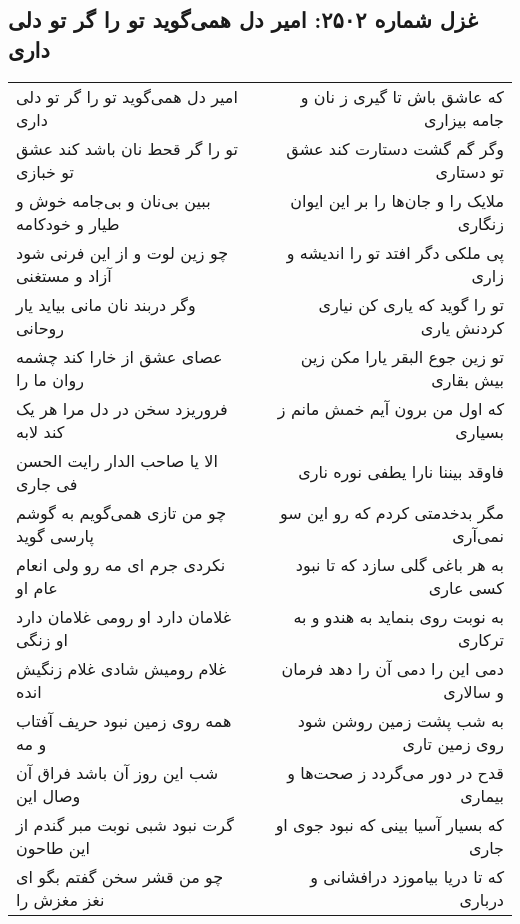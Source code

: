 \begin{center}
\section*{غزل شماره ۲۵۰۲: امیر دل همی‌گوید تو را گر تو دلی داری}
\label{sec:2502}
\begin{longtable}{l p{0.5cm} r}
امیر دل همی‌گوید تو را گر تو دلی داری
&&
که عاشق باش تا گیری ز نان و جامه بیزاری
\\
تو را گر قحط نان باشد کند عشق تو خبازی
&&
وگر گم گشت دستارت کند عشق تو دستاری
\\
ببین بی‌نان و بی‌جامه خوش و طیار و خودکامه
&&
ملایک را و جان‌ها را بر این ایوان زنگاری
\\
چو زین لوت و از این فرنی شود آزاد و مستغنی
&&
پی ملکی دگر افتد تو را اندیشه و زاری
\\
وگر دربند نان مانی بیاید یار روحانی
&&
تو را گوید که یاری کن نیاری کردنش یاری
\\
عصای عشق از خارا کند چشمه روان ما را
&&
تو زین جوع البقر یارا مکن زین بیش بقاری
\\
فروریزد سخن در دل مرا هر یک کند لابه
&&
که اول من برون آیم خمش مانم ز بسیاری
\\
الا یا صاحب الدار رایت الحسن فی جاری
&&
فاوقد بیننا نارا یطفی نوره ناری
\\
چو من تازی همی‌گویم به گوشم پارسی گوید
&&
مگر بدخدمتی کردم که رو این سو نمی‌آری
\\
نکردی جرم ای مه رو ولی انعام عام او
&&
به هر باغی گلی سازد که تا نبود کسی عاری
\\
غلامان دارد او رومی غلامان دارد او زنگی
&&
به نوبت روی بنماید به هندو و به ترکاری
\\
غلام رومیش شادی غلام زنگیش انده
&&
دمی این را دمی آن را دهد فرمان و سالاری
\\
همه روی زمین نبود حریف آفتاب و مه
&&
به شب پشت زمین روشن شود روی زمین تاری
\\
شب این روز آن باشد فراق آن وصال این
&&
قدح در دور می‌گردد ز صحت‌ها و بیماری
\\
گرت نبود شبی نوبت مبر گندم از این طاحون
&&
که بسیار آسیا بینی که نبود جوی او جاری
\\
چو من قشر سخن گفتم بگو ای نغز مغزش را
&&
که تا دریا بیاموزد درافشانی و درباری
\\
\end{longtable}
\end{center}
